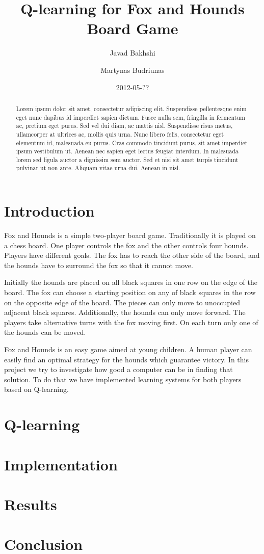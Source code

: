 \documentclass[a4paper]{article}
\title{Q-learning for Fox and Hounds Board Game}
\author{Javad Bakhshi \and Martynas Budriunas}
\date{2012-05-??}
\begin{document}
\maketitle

\begin{abstract}
Lorem ipsum dolor sit amet, consectetur adipiscing elit. Suspendisse
pellentesque enim eget nunc dapibus id imperdiet sapien dictum. Fusce nulla
sem, fringilla in fermentum ac, pretium eget purus. Sed vel dui diam, ac mattis
nisl. Suspendisse risus metus, ullamcorper at ultrices ac, mollis quis urna.
Nunc libero felis, consectetur eget elementum id, malesuada eu purus. Cras
commodo tincidunt purus, sit amet imperdiet ipsum vestibulum ut. Aenean nec
sapien eget lectus feugiat interdum. In malesuada lorem sed ligula auctor a
dignissim sem auctor. Sed et nisi sit amet turpis tincidunt pulvinar ut non
ante. Aliquam vitae urna dui. Aenean in nisl. 
\end{abstract}

\section{Introduction}
Fox and Hounds is a simple two-player board game. Traditionally it is played on
a chess board. One player controls the fox and the other controls four hounds.
Players have different goals. The fox has to reach the other side of the board,
and the hounds have to surround the fox so that it cannot move.

Initially the hounds are placed on all black squares in one row on the edge of
the board. The fox can choose a starting position on any of black squares in the
row on the opposite edge of the board. The pieces can only move to unoccupied
adjacent black squares. Additionally, the hounds can only move forward. The
players take alternative turns with the fox moving first. On each turn only one
of the hounds can be moved.

Fox and Hounds is an easy game aimed at young children. A human player can
easily find an optimal strategy for the hounds which guarantee victory. In this
project we try to investigate how good a computer can be in finding that
solution. To do that we have implemented learning systems for both players
based on Q-learning.

\section{Q-learning}

\section{Implementation}

\section{Results}

\section{Conclusion}

\begin{thebibliography}{9}
\end{thebibliography}
\end{document}
